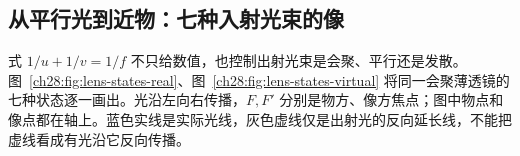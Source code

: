 \subsection{从平行光到近物：七种入射光束的像}
式 $1/u+1/v=1/f$ 不只给数值，也控制出射光束是会聚、平行还是发散。图~\ref{ch28:fig:lens-states-real}、图~\ref{ch28:fig:lens-states-virtual} 将同一会聚薄透镜的七种状态逐一画出。光沿左向右传播，$F,F'$ 分别是物方、像方焦点；图中物点和像点都在轴上。蓝色实线是实际光线，灰色虚线仅是出射光的反向延长线，不能把虚线看成有光沿它反向传播。

\newcommand{\LensStateRow}[5]{%
\begin{scope}[yshift=#1cm]
 \draw[gray,thin](-4.8,0)--(4.7,0);
 \draw[thick,<->](0,-.55)--(0,.55);
 \foreach \x/\lab in {-2.4/2F,-1.2/F,1.2/F',2.4/2F'}{
  \draw[gray] (\x,-.04)--(\x,.04);
  \draw[gray,thin] (\x,-.6)--(\x,-.73);
  \node[below,font=\scriptsize]at(\x,-.73){$\lab$};
 }
 \foreach \rawheight in {-.32,-.16,.16,.32}{
  \pgfmathsetmacro{\h}{ifthenelse(and(#2>0,#2<.6),.6875*\rawheight,\rawheight)}
  \pgfmathsetmacro{\slopein}{ifthenelse(#2==0,0,\h/max(#2,.001))}
  \pgfmathsetmacro{\slopeout}{\slopein-\h/1.2}
  \pgfmathsetmacro{\leftx}{ifthenelse(#2==0,-4.6,-#2)}
  \draw[DeepBlue,thin,->](\leftx,{\h+\slopein*\leftx})--(0,\h);
  \draw[DeepBlue,thin,->](0,\h)--(#3,{\h+\slopeout*#3});
  \ifnum#4=1
   \pgfmathsetmacro{\virtualx}{-\h/\slopeout}
   \draw[gray,dashed,thin](\virtualx,0)--(0,\h);
  \fi
 }
 \node[right,align=left,text width=3.6cm]at(5,.03){#5};
\end{scope}}
\begin{center}\begin{minipage}{\linewidth}\centering
{}
\end{minipage}\end{center}

